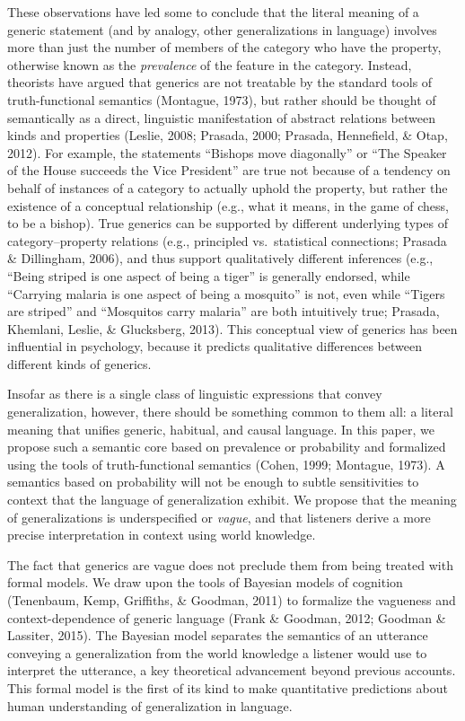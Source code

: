 \documentclass[english,,man,floatsintext]{apa6}
\theoremstyle{definition}
\theoremstyle{definition}
\theoremstyle{definition}
\theoremstyle{remark}
\begin{document}
These observations have led some to conclude that the literal meaning of
a generic statement (and by analogy, other generalizations in language)
involves more than just the number of members of the category who have
the property, otherwise known as the \emph{prevalence} of the feature in
the category. Instead, theorists have argued that generics are not
treatable by the standard tools of truth-functional semantics (Montague,
1973), but rather should be thought of semantically as a direct,
linguistic manifestation of abstract relations between kinds and
properties (Leslie, 2008; Prasada, 2000; Prasada, Hennefield, \& Otap,
2012). For example, the statements \enquote{Bishops move diagonally} or
\enquote{The Speaker of the House succeeds the Vice President} are true
not because of a tendency on behalf of instances of a category to
actually uphold the property, but rather the existence of a conceptual
relationship (e.g., what it means, in the game of chess, to be a
bishop). True generics can be supported by different underlying types of
category--property relations (e.g., principled vs.~statistical
connections; Prasada \& Dillingham, 2006), and thus support
qualitatively different inferences (e.g., ``Being striped is one aspect
of being a tiger'' is generally endorsed, while ``Carrying malaria is
one aspect of being a mosquito'' is not, even while ``Tigers are
striped'' and ``Mosquitos carry malaria'' are both intuitively true;
Prasada, Khemlani, Leslie, \& Glucksberg, 2013). This conceptual view of
generics has been influential in psychology, because it predicts
qualitative differences between different kinds of generics.

Insofar as there is a single class of linguistic expressions that convey
generalization, however, there should be something common to them all: a
literal meaning that unifies generic, habitual, and causal language. In
this paper, we propose such a semantic core based on prevalence or
probability and formalized using the tools of truth-functional semantics
(Cohen, 1999; Montague, 1973). A semantics based on probability will not
be enough to subtle sensitivities to context that the language of
generalization exhibit. We propose that the meaning of generalizations
is underspecified or \emph{vague}, and that listeners derive a more
precise interpretation in context using world knowledge.

The fact that generics are vague does not preclude them from being
treated with formal models. We draw upon the tools of Bayesian models of
cognition (Tenenbaum, Kemp, Griffiths, \& Goodman, 2011) to formalize
the vagueness and context-dependence of generic language (Frank \&
Goodman, 2012; Goodman \& Lassiter, 2015). The Bayesian model separates
the semantics of an utterance conveying a generalization from the world
knowledge a listener would use to interpret the utterance, a key
theoretical advancement beyond previous accounts. This formal model is
the first of its kind to make quantitative predictions about human
understanding of generalization in language.
\end{document}
